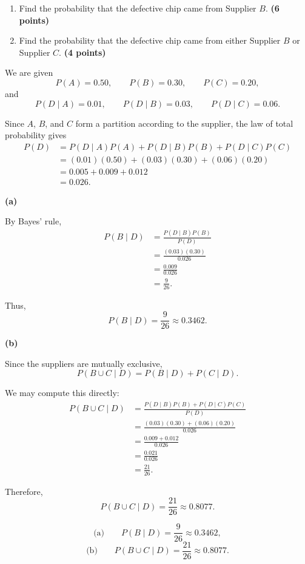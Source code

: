 \documentclass[11pt]{article}
\begin{document}
\begin{enumerate}[label=(\alph*),leftmargin=*,itemsep=0.8em]

    \item Find the probability that the defective chip came from
    Supplier $B$.
    \hfill \textbf{(6 points)}

    \item Find the probability that the defective chip came from
    either Supplier $B$ or Supplier $C$.
    \hfill \textbf{(4 points)}

\end{enumerate}


\begin{solutionbox}

We are given
\[
P(A)=0.50,\qquad
P(B)=0.30,\qquad
P(C)=0.20,
\]
and
\[
P(D\mid A)=0.01,\qquad
P(D\mid B)=0.03,\qquad
P(D\mid C)=0.06.
\]

Since $A$, $B$, and $C$ form a partition according to the supplier,
the law of total probability gives
\begin{align*}
P(D)
&=
P(D\mid A)P(A)
+
P(D\mid B)P(B)
+
P(D\mid C)P(C)\\
&=
(0.01)(0.50)
+
(0.03)(0.30)
+
(0.06)(0.20)\\
&=
0.005+0.009+0.012\\
&=
0.026.
\end{align*}


\textbf{(a)}

By Bayes' rule,
\begin{align*}
P(B\mid D)
&=
\frac{P(D\mid B)P(B)}{P(D)}\\
&=
\frac{(0.03)(0.30)}{0.026}\\
&=
\frac{0.009}{0.026}\\
&=
\frac{9}{26}.
\end{align*}

Thus,
\[
P(B\mid D)
=
\frac{9}{26}
\approx 0.3462.
\]


\textbf{(b)}

Since the suppliers are mutually exclusive,
\[
P(B\cup C\mid D)
=
P(B\mid D)+P(C\mid D).
\]

We may compute this directly:
\begin{align*}
P(B\cup C\mid D)
&=
\frac{
P(D\mid B)P(B)+P(D\mid C)P(C)
}{
P(D)
}\\
&=
\frac{
(0.03)(0.30)+(0.06)(0.20)
}{
0.026
}\\
&=
\frac{0.009+0.012}{0.026}\\
&=
\frac{0.021}{0.026}\\
&=
\frac{21}{26}.
\end{align*}

Therefore,
\[
P(B\cup C\mid D)
=
\frac{21}{26}
\approx0.8077.
\]

\begin{finalanswerbox}
\[
\text{(a)}\qquad
P(B\mid D)=\frac{9}{26}\approx0.3462,
\]
\[
\text{(b)}\qquad
P(B\cup C\mid D)=\frac{21}{26}\approx0.8077.
\]
\end{finalanswerbox}

\end{solutionbox}
\end{document}
